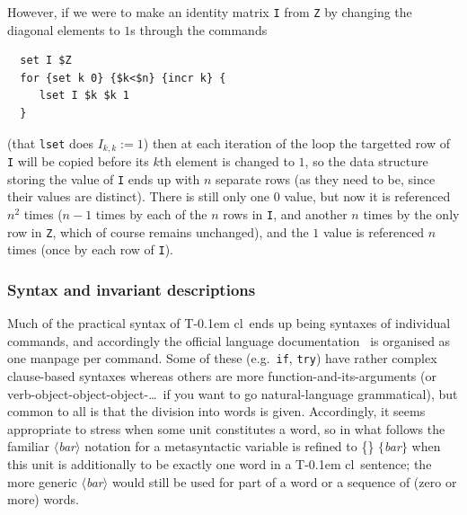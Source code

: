 \documentclass{article}
\theoremstyle{definition}
\newcommand{\Tcl}{T\kern-0.1em cl}
\newcommand{\word}[1]{%
   \relax
   \ifmmode
     \{\text{\normalfont\itshape #1}\}%
   \else
     $\{$\textnormal{\itshape #1}$\}$%
   \fi
}
\newcommand{\meta}[1]{%
   \relax
   \ifmmode
     \langle\text{\normalfont\itshape #1}\rangle%
   \else
     $\langle$\textnormal{\itshape #1}$\rangle$%
   \fi
}
\begin{document}
However, if we were to make an 
identity matrix \verb|I| from \verb|Z| by changing the diagonal 
elements to $1$s through the commands
\begin{verbatim}
  set I $Z
  for {set k 0} {$k<$n} {incr k} {
     lset I $k $k 1 
  }
\end{verbatim}
(that \texttt{lset} does \(I_{k,k} := 1\)) then at each iteration of 
the loop the targetted row of \verb|I| will be copied before its $k$th 
element is changed to $1$, so the data structure storing the value of 
\verb|I| ends up with $n$ separate rows (as they need to be, since their 
values are distinct). 
There is still only one $0$ value, but now it is referenced $n^2$ 
times ($n-1$ times by each of the $n$ rows in \verb$I$, and another 
$n$ times by the only row in \verb$Z$, which of course remains 
unchanged), and the $1$ value is referenced $n$ times (once by each 
row of \verb$I$).



\subsubsection{Syntax and invariant descriptions}

Much of the practical syntax of \Tcl\ ends up being syntaxes of 
individual commands, and accordingly the official language 
documentation~\cite{tcl-lang-doc-8.6} is organised as one manpage per 
command. Some of these (e.g.~\verb|if|, \verb|try|) have rather complex 
clause-based syntaxes whereas others are more 
function-and-its-arguments (or verb-object-object-object-\dots\ if 
you want to go natural-language grammatical), but common to all is 
that the division into words is given. Accordingly, it seems appropriate 
to stress when some unit constitutes a word, so in what follows the 
familiar \meta{bar} notation for a metasyntactic variable is refined 
to \word{bar} when this unit is additionally to be exactly one word 
in a \Tcl\ sentence; the more generic \meta{bar} would still be used 
for part of a word or a sequence of (zero or more) words.
\end{document}
